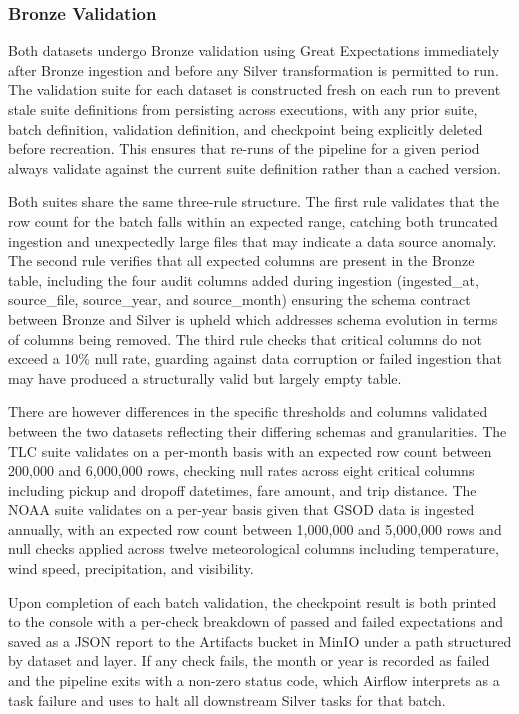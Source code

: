 \documentclass[conference]{IEEEtran}
\begin{document}
\subsubsection{Bronze Validation}

Both datasets undergo Bronze validation using Great Expectations  immediately after Bronze ingestion and before any Silver transformation is permitted to run. The validation suite for each dataset is constructed fresh on each run to prevent stale suite definitions from persisting across executions, with any prior suite, batch definition, validation definition, and checkpoint being explicitly deleted before recreation. This ensures that re-runs of the pipeline for a given period always validate against the current suite definition rather than a cached version.

Both suites share the same three-rule structure. The first rule validates that the row count for the batch falls within an expected range, catching both truncated ingestion and unexpectedly large files that may indicate a data source anomaly. The second rule verifies that all expected columns are present in the Bronze table, including the four audit columns added during ingestion (ingested\_at, source\_file, source\_year, and source\_month)  ensuring the schema contract between Bronze and Silver is upheld which addresses schema evolution in terms of columns being removed. The third rule checks that critical columns do not exceed a 10\% null rate, guarding against data corruption or failed ingestion that may have produced a structurally valid but largely empty table.

There are however differences in the specific thresholds and columns validated between the two datasets reflecting their differing schemas and granularities. The TLC suite validates on a per-month basis with an expected row count between 200,000 and 6,000,000 rows, checking null rates across eight critical columns including pickup and dropoff datetimes, fare amount, and trip distance. The NOAA suite validates on a per-year basis given that GSOD data is ingested annually, with an expected row count between 1,000,000 and 5,000,000 rows and null checks applied across twelve meteorological columns including temperature, wind speed, precipitation, and visibility.

Upon completion of each batch validation, the checkpoint result is both printed to the console with a per-check breakdown of passed and failed expectations and saved as a JSON report to the Artifacts bucket in MinIO under a path structured by dataset and layer. If any check fails, the month or year is recorded as failed and the pipeline exits with a non-zero status code, which Airflow interprets as a task failure and uses to halt all downstream Silver tasks for that batch.
\end{document}

